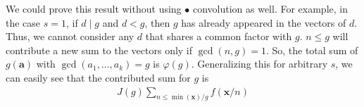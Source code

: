 \documentclass[elemannt.tex]{subfile}
\begin{document}
		\begin{remark}
			We could prove this result without using $\bullet$ convolution as well. For example, in the case $s=1$, if $d\mid g$ and $d<g$, then $g$ has already appeared in the vectors of $d$. Thus, we cannot consider any $d$ that shares a common factor with $g$. $n\leq g$ will contribute a new sum to the vectors only if $\gcd(n,g)=1$. So, the total sum of $g(\mathbf{a})$ with $\gcd(a_{1},\ldots,a_{k})=g$ is $\varphi(g)$. Generalizing this for arbitrary $s$, we can easily see that the contributed sum for $g$ is
				\begin{align*}
					J(g)\sum_{n\leq\min(\mathbf{x})/g}f(\mathbf{x}/n)
				\end{align*}
		\end{remark}
\end{document}
